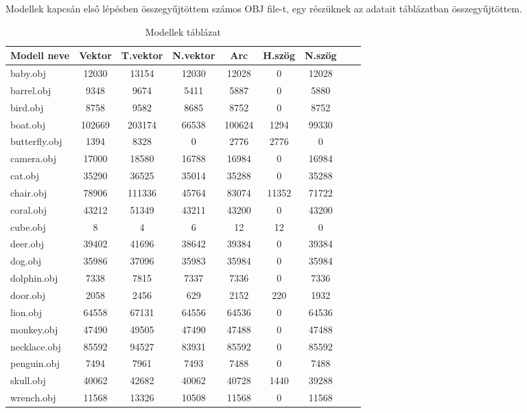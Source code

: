 
Modellek kapcsán első lépésben összegyűjtöttem számos OBJ file-t, egy részüknek az adatait  táblázatban összegyűjtöttem.

\begin{table}[h]
\centering
\caption{Modellek táblázat}
\bigskip
\label{tab:modellek}
\begin{tabular}{|l|c|c|c|c|c|c|c|c|}
Modell neve& Vektor & T.vektor & N.vektor & Arc & H.szög & N.szög \\
\hline
baby.obj & 12030 & 13154 & 12030 & 12028 & 0 & 12028 \\
barrel.obj & 9348 & 9674 & 5411 & 5887 & 0 & 5880	\\
bird.obj & 8758 & 9582 & 8685 & 8752 & 0 & 8752 \\
boat.obj & 102669 & 203174 & 66538 & 100624 & 1294 & 99330\\
butterfly.obj & 1394 &	8328 &	0 & 2776 &	2776 &	0 \\
camera.obj & 17000 & 18580 & 16788 & 16984 & 0 & 16984 \\
cat.obj & 35290 & 36525 & 35014 & 35288 & 0 &	35288 \\
chair.obj & 78906 & 111336 & 45764 & 83074 & 11352 & 71722 \\
coral.obj & 43212 & 51349 & 43211 & 43200 & 0 & 43200 \\
cube.obj & 8 & 4 & 6 & 12 & 12 & 0 \\
deer.obj & 39402 & 41696 & 38642 & 39384 & 0 & 39384 \\
dog.obj & 35986 & 37096 & 35983 & 35984 & 0 & 35984 \\
dolphin.obj & 7338 & 7815 & 7337 & 7336 & 0 & 7336 \\
door.obj & 2058 & 2456 & 629 & 2152 &	220 & 1932 \\
lion.obj & 64558 & 67131 & 64556 & 64536 & 0 & 64536 \\
monkey.obj & 47490 & 49505 & 47490 & 47488 & 0 & 47488 \\
necklace.obj & 85592 &	94527 & 83931 & 85592 & 0 & 85592 \\
penguin.obj & 7494 & 7961 & 7493 & 7488 & 0 & 7488 \\
skull.obj & 40062 & 42682 & 40062 & 40728 & 1440 & 39288 \\
wrench.obj & 11568 & 13326 & 10508 & 11568 & 0 & 11568 \\
\hline
\end{tabular}
\label{fig:modellekt}
\end{table}

